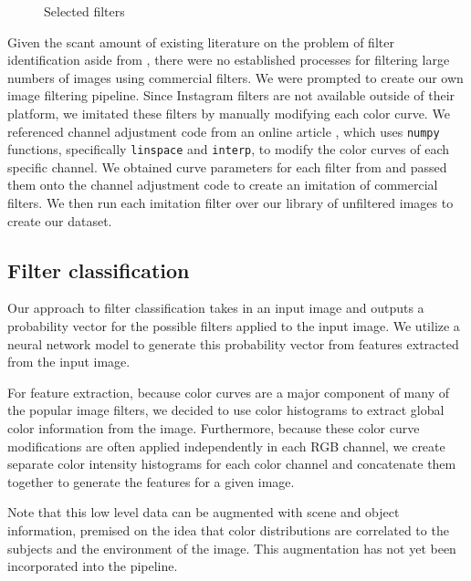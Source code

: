 \documentclass[11pt]{article}
\begin{document}
\begin{figure}[H]
    \caption{Selected filters}
    \label{fig:filters}
\end{figure}

Given the scant amount of existing literature on the problem of filter identification aside from \cite{IEEE_Inversion}, there were no established processes for filtering large numbers of images using commercial filters. We were prompted to create our own image filtering pipeline. Since Instagram filters are not available outside of their platform, we imitated these filters by manually modifying each color curve. We referenced channel adjustment code from an online article \cite{Instafilters}, which uses \verb|numpy| functions, specifically \verb|linspace| and \verb|interp|, to modify the color curves of each specific channel. We obtained curve parameters for each filter from \cite{Instafilters_tutorial} and passed them onto the channel adjustment code to create an imitation of commercial filters. We then run each imitation filter over our library of unfiltered images to create our dataset.

\subsection*{Filter classification}
Our approach to filter classification takes in an input image and outputs a probability vector for the possible filters applied to the input image. We utilize a neural network model to generate this probability vector from features extracted from the input image.

For feature extraction, because color curves are a major component of many of the popular image filters, we decided to use color histograms to extract global color information from the image. Furthermore, because these color curve modifications are often applied independently in each RGB channel, we create separate color intensity histograms for each color channel and concatenate them together to generate the features for a given image.

Note that this low level data can be augmented with scene and object information, premised on the idea that color distributions are correlated to the subjects and the environment of the image. This augmentation has not yet been incorporated into the pipeline.
\end{document}
